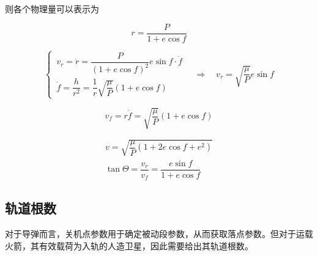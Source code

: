 
则各个物理量可以表示为

\begin{equation}
	r = \dfrac{P}{1 + e \cos f}
\end{equation}

\sssection[径向速度]
\begin{equation}
	\begin{cases}
		\, v_r = \dot{r} = \dfrac{P}{\left(1 + e \cos f\right)^2} e \sin f \cdot \dot{f} \\[0.8em]
		\, \dot{f} = \dfrac{h}{r^2} = \dfrac{1}{r} \sqrt{\dfrac{\mu}{P}}(1 + e \cos f)
	\end{cases}
	\quad \Rightarrow \quad v_r = \sqrt{\dfrac{\mu}{P}}e \sin f
\end{equation}

\sssection[周向速度]
\begin{equation}
	v_f = r\dot{f} = \sqrt{\dfrac{\mu}{P}}(1 + e \cos f)
\end{equation}

\sssection[速度及其倾角]
\begin{align}
	v = \sqrt{\dfrac{\mu}{P} \left(1 + 2 e \cos f + e^2\right)} \\
	\tan \varTheta = \dfrac{v_r}{v_f} = \dfrac{e \sin f}{1 + e \cos f}
\end{align}

\subsection{轨道根数}
对于导弹而言，关机点参数用于确定被动段参数，从而获取落点参数。但对于运载火箭，其有效载荷为入轨的人造卫星，因此需要给出其轨道根数。

